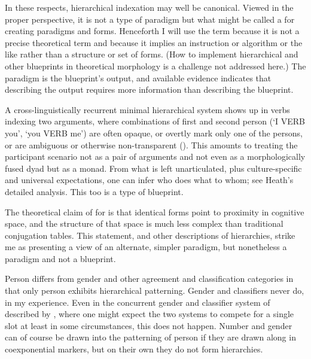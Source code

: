 \documentclass[output=collectionpaper]{langsci/langscibook}
\begin{document}
In these respects, hierarchical indexation may well be canonical. Viewed in the proper perspective, it is not a type of paradigm but what might be called a  for creating paradigms and forms. Henceforth I will use the term  because it is not a precise theoretical term and because it implies an instruction or algorithm or the like rather than a structure or set of forms. (How to implement hierarchical and other blueprints in theoretical morphology is a challenge not addressed here.) The paradigm is the blueprint's output, and available evidence indicates that describing the output requires more information than describing the blueprint.

A cross-linguistically recurrent minimal hierarchical system shows up in verbs indexing two arguments, where combinations of first and second person (`I VERB you', `you VERB me') are often opaque, or overtly mark only one of the persons, or are ambiguous or otherwise non-transparent (\citealt{Heath1991,Heath1998}). This amounts to treating the participant scenario not as a pair of arguments and not even as a morphologically fused dyad but as a monad. From what is left unarticulated, plus culture-specific and universal expectations, one can infer who does what to whom; see Heath's detailed analysis. This too is a type of blueprint.

The theoretical claim of \citet[376]{Kibrik2003} for  is that identical forms point to proximity in cognitive space, and the structure of that space is much less complex than traditional conjugation tables. This statement, and other descriptions of hierarchies, strike me as presenting a view of an alternate, simpler paradigm, but nonetheless a paradigm and not a blueprint.

Person differs from gender and other agreement and classification categories in that only person exhibits hierarchical patterning. Gender and classifiers never do, in my experience. Even in the concurrent gender and classifier system of  described by \citet{Corbett2016}, where one might expect the two systems to compete for a single slot at least in some circumstances, this does not happen. Number and gender can of course be drawn into the patterning of person if they are drawn along in coexponential markers, but on their own they do not form hierarchies.
\end{document}
